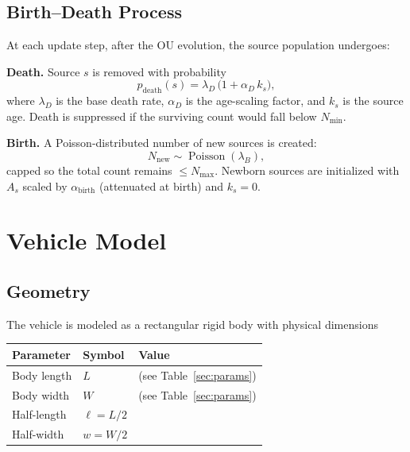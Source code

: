 \documentclass[11pt,a4paper]{article}
\begin{document}
\subsection{Birth--Death Process}

At each update step, after the OU evolution, the source population undergoes:

\textbf{Death.}  Source $s$ is removed with probability
\begin{equation}
  p_{\mathrm{death}}(s) = \lambda_D \,\bigl(1 + \alpha_D\,k_s\bigr),
\end{equation}
where $\lambda_D$ is the base death rate, $\alpha_D$ is the age-scaling factor,
and $k_s$ is the source age.
Death is suppressed if the surviving count would fall below $N_{\min}$.

\textbf{Birth.}  A Poisson-distributed number of new sources is created:
\begin{equation}
  N_{\mathrm{new}} \sim \operatorname{Poisson}(\lambda_B),
\end{equation}
capped so the total count remains $\le N_{\max}$.
Newborn sources are initialized with $A_s$ scaled by $\alpha_{\mathrm{birth}}$
(attenuated at birth) and $k_s = 0$.

\section{Vehicle Model}

\subsection{Geometry}

The vehicle is modeled as a rectangular rigid body with physical dimensions

\begin{center}
\begin{tabular}{lll}
\toprule
Parameter & Symbol & Value \\
\midrule
Body length & $L$ & (see Table~\ref{sec:params}) \\
Body width  & $W$ & (see Table~\ref{sec:params}) \\
Half-length & $\ell = L/2$ & \\
Half-width  & $w = W/2$   & \\
\bottomrule
\end{tabular}
\end{center}
\end{document}
